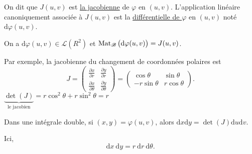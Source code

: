 \begin{rmk}
	On dit que $J(u,v)$ est \underline{la jacobienne} de $\varphi$ en $(u,v)$.
	L'application linéaire canoniquement associée à $J(u,v)$ est la \underline{différentielle de $\varphi$} en $(u,v)$ noté $\mathrm{d}\varphi(u,v)$.

	On a $\mathrm{d}\varphi(u,v) \in \mathcal{L}(R^2)$ et $\operatorname{Mat}_{\mathcal{B}}\big(\mathrm{d}\varphi(u,v)\big) = J(u,v)$.

	Par exemple, la jacobienne du changement de coordonnées polaires est \[
		J = \begin{pmatrix}
			\frac{\partial x}{\partial r} & \frac{\partial y}{\partial r}\\[3mm]
			\frac{\partial x}{\partial \theta} & \frac{\partial y}{\partial \theta}
		\end{pmatrix}
		= \begin{pmatrix}
			\cos\theta&\sin\theta\\
			-r\sin\theta&r\cos\theta
		\end{pmatrix}.
	\]
	$\underbrace{\det(J)}_{\text{le jacobien}} = r\cos^2\theta + r\sin^2\theta = r$

	Dans une intégrale double, si $(x,y) = \varphi(u,v)$, alors $\mathrm{d}x\mathrm{d}y = \det(J)\mathrm{d}u\mathrm{d}v$.

	Ici, \[
		\mathrm{d}x\ \mathrm{d}y = r\ \mathrm{d}r\ \mathrm{d}\theta.
	\]
\end{rmk}

